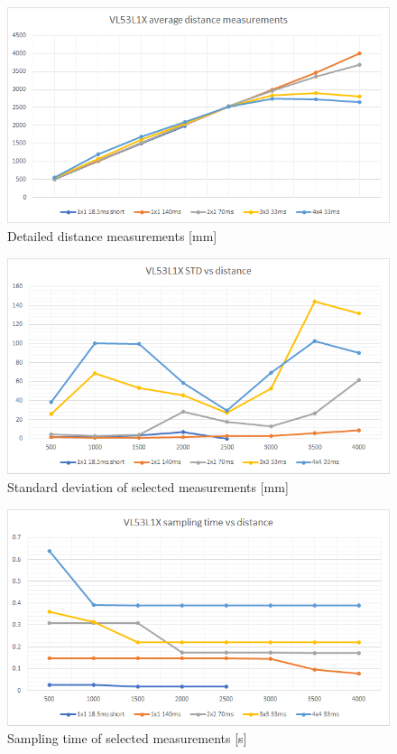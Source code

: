 \begin{figure}[!h]
    \centering
	\includegraphics[width=115mm, keepaspectratio]{figures/vl53l1x_measurements_02_dist.png}
    \caption{Detailed distance measurements [mm]}
    \label{fig:vl53l1x_meas_detailed_dist}
\end{figure}

\begin{figure}[!h]
    \centering
	\includegraphics[width=115mm, keepaspectratio]{figures/vl53l1x_measurements_02_std.png}
    \caption{Standard deviation of selected measurements [mm]}
    \label{fig:vl53l1x_meas_detailed_std}
\end{figure}

\newpage

\begin{figure}[!h]
    \centering
	\includegraphics[width=115mm, keepaspectratio]{figures/vl53l1x_measurements_02_ts.png}
    \caption{Sampling time of selected measurements [s]}
    \label{fig:vl53l1x_meas_detailed_ts}
\end{figure}







